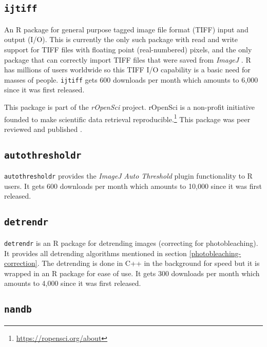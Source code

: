 \documentclass[12pt,]{book}
\let\rmarkdownfootnote\footnote%
\def\footnote{\protect\rmarkdownfootnote}
\theoremstyle{definition}
\theoremstyle{definition}
\theoremstyle{definition}
\theoremstyle{remark}
\begin{document}
\subsection{\texorpdfstring{\texttt{ijtiff}}{ijtiff}}\label{ijtiff}

An R package for general purpose tagged image file format (TIFF) input
and output (I/O). This is currently the only such package with read and
write support for TIFF files with floating point (real-numbered) pixels,
and the only package that can correctly import TIFF files that were
saved from \emph{ImageJ} \citep{ImageJ}. R has millions of users
worldwide so this TIFF I/O capability is a basic need for masses of
people. \texttt{ijtiff} gets 600 downloads per month which amounts to
6,000 since it was first released.

This package is part of the \emph{rOpenSci} project. rOpenSci is a
non-profit initiative founded to make scientific data retrieval
reproducible.\footnote{\url{https://ropensci.org/about}} This package
was peer reviewed and published \citep{ijtiff}.

\subsection{\texorpdfstring{\texttt{autothresholdr}}{autothresholdr}}\label{autothresholdr}

\texttt{autothresholdr} provides the \emph{ImageJ} \citep{ImageJ}
\emph{Auto Threshold} plugin \citep{autothresholdr} functionality to R
users. It gets 600 downloads per month which amounts to 10,000 since it
was first released.

\subsection{\texorpdfstring{\texttt{detrendr}}{detrendr}}\label{detrendr}

\texttt{detrendr} is an R package for detrending images (correcting for
photobleaching). It provides all detrending algorithms mentioned in
section \ref{photobleaching-correction}. The detrending is done in C++
in the background for speed but it is wrapped in an R package for ease
of use. It gets 300 downloads per month which amounts to 4,000 since it
was first released.

\subsection{\texorpdfstring{\texttt{nandb}}{nandb}}\label{nandb}
\end{document}
